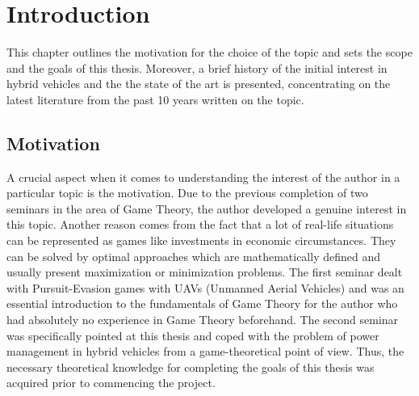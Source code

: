 \chapter{Introduction}
\label{chp:intro}
This chapter outlines the motivation for the choice of the topic and sets the scope and the goals of this thesis. Moreover, a brief history of the initial interest in hybrid vehicles and the the state of the art is presented, concentrating on the latest literature from the past 10 years written on the topic.

\section{Motivation}
A crucial aspect when it comes to understanding the interest of the author in a particular topic is the motivation. Due to the previous completion of two seminars in the area of Game Theory, the author developed a genuine interest in this topic. Another reason comes from the fact that a lot of real-life situations can be represented as games like investments in economic circumstances. They can be solved by optimal approaches which are mathematically defined and usually present maximization or minimization problems. The first seminar dealt with Pursuit-Evasion games with UAVs (Unmanned Aerial Vehicles) and was an essential introduction to the fundamentals of Game Theory for the author who had absolutely no experience in Game Theory beforehand. The second seminar was specifically pointed at this thesis and coped with the problem of power management in hybrid vehicles from a game-theoretical point of view. Thus, the necessary theoretical knowledge for completing the goals of this thesis was acquired prior to commencing the project.

